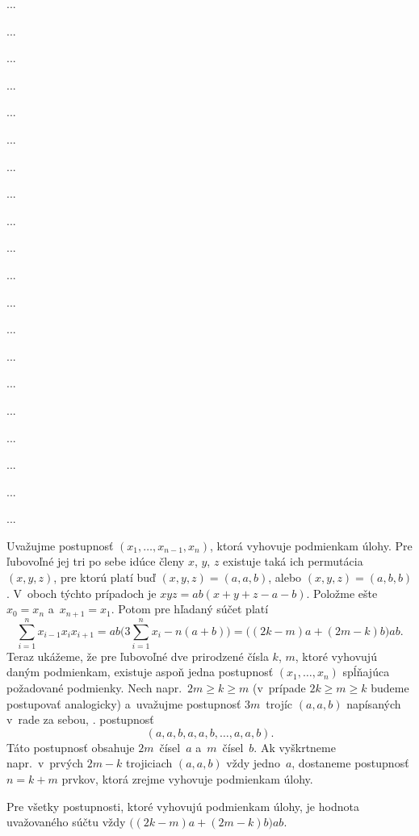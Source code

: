{%
...}

{%
...}

{%
...}

{%
...}

{%
...}

{%
...}

{%
...}

{%
...}

{%
...}

{%
...}

{%
...}

{%
...}

{%
...}

{%
...}

{%
...}

{%
...}

{%
...}

{%
...}

{%
...}

{%
...}

{%
Uvažujme postupnosť $(x_1,\dots ,x_{n-1},x_n)$, ktorá vyhovuje
podmienkam úlohy. Pre ľubovoľné jej tri po sebe idúce členy $x$,
$y$, $z$ existuje taká ich permutácia $(x,y,z)$, pre ktorú
platí buď $(x,y,z)=(a,a,b)$, alebo $(x,y,z)=(a,b,b)$. V~oboch
týchto prípadoch je $xyz=ab(x+y+z-a-b)$. Položme ešte $x_0=x_n$
a~$x_{n+1}=x_1$. Potom pre hľadaný súčet platí
$$
\sum_{i=1}^n x_{i-1}x_ix_{i+1}=ab\biggl(3\sum_{i=1}^n
x_i-n(a+b)\biggr)
    =\bigl((2k-m)a+(2m-k)b\bigr)ab.
$$
Teraz ukážeme, že pre ľubovoľné dve prirodzené čísla $k$, $m$, ktoré
vyhovujú daným podmienkam, existuje aspoň jedna postupnosť
$(x_1,\dots,x_n)$ spĺňajúca požadované podmienky. Nech napr.~$2m\geq k\geq m$
(v~prípade $2k\geq m\geq k$ budeme postupovať
analogicky) a~uvažujme postupnosť $3m$~trojíc $(a,a,b)$
napísaných v~rade za sebou, \tj. postupnosť
$$
(a,a,b,a,a,b,\dots,a,a,b).
$$
Táto postupnosť obsahuje $2m$~čísel~$a$ a~$m$~čísel~$b$.
Ak vyškrtneme napr.~v~prvých $2m-k$ trojiciach $(a,a,b)$
vždy jedno~$a$, dostaneme postupnosť $n=k+m$ prvkov,
ktorá zrejme vyhovuje podmienkam úlohy.

\zaver
Pre všetky postupnosti, ktoré vyhovujú podmienkam úlohy, je
hodnota uvažovaného súčtu vždy $\bigl((2k-m)a+(2m-k)b\bigr)ab$.}

